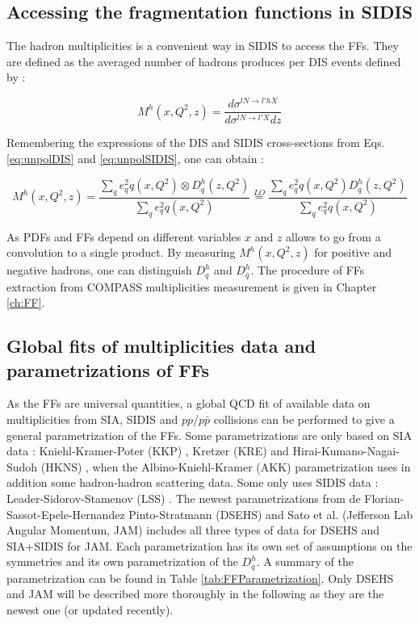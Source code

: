 \subsection{Accessing the fragmentation functions in SIDIS}

The hadron multiplicities is a convenient way in SIDIS to access the FFs. They are defined as the averaged number of hadrons produces per DIS events defined by :

\begin{equation}
  M^h(x,Q^2,z) = \frac{d\sigma^{lN \rightarrow l'hX}}{d\sigma^{lN \rightarrow l'X}dz}
\end{equation}

Remembering the expressions of the DIS and SIDIS cross-sections from Eqs. \ref{eq:unpolDIS} and \ref{eq:unpolSIDIS}, one can obtain :

\begin{equation}
  M^h(x,Q^2,z) = \frac{\sum_q e^2_q q(x,Q^2) \otimes D^h_q(z,Q^2)}{\sum_q e^2_q q(x,Q^2)} \stackrel{LO}{=} \frac{\sum_q e^2_q q(x,Q^2) D^h_q(z,Q^2)}{\sum_q e^2_q q(x,Q^2)}
\end{equation}

As PDFs and FFs depend on different variables $x$ and $z$ allows to go from a convolution to a single product. By measuring $M^h(x,Q^2,z)$ for positive and negative hadrons, one can distinguish $D^h_q$ and $D^h_{\bar{q}}$. The procedure of FFs extraction from COMPASS multiplicities measurement is given in Chapter \ref{ch:FF}.

\subsection{Global fits of multiplicities data and parametrizations of FFs}

As the FFs are universal quantities, a global QCD fit of available data on multiplicities from SIA, SIDIS and $pp$/$p\bar{p}$ collisions can be performed to give a general parametrization of the FFs. Some parametrizations are only based on SIA data : Kniehl-Kramer-Poter (KKP) \cite{KKP}, Kretzer (KRE) \cite{KRE} and Hirai-Kumano-Nagai-Sudoh (HKNS) \cite{HKNS}, when the Albino-Kniehl-Kramer (AKK) \cite{AKK} parametrization uses in addition some hadron-hadron scattering data. Some only uses SIDIS data : Leader-Sidorov-Stamenov (LSS) \cite{LSS}. The newest parametrizations from de Florian-Sassot-Epele-Hernandez Pinto-Stratmann (DSEHS) \cite{DSEHS} and Sato et al. (Jefferson Lab Angular Momentum, JAM) \cite{JAM} includes all three types of data for DSEHS and SIA+SIDIS for JAM. Each parametrization has its own set of assumptions on the symmetries and its own parametrization of the $D^h_q$. A summary of the parametrization can be found in Table \ref{tab:FFParametrization}. Only DSEHS and JAM will be described more thoroughly in the following as they are the newest one (or updated recently).

